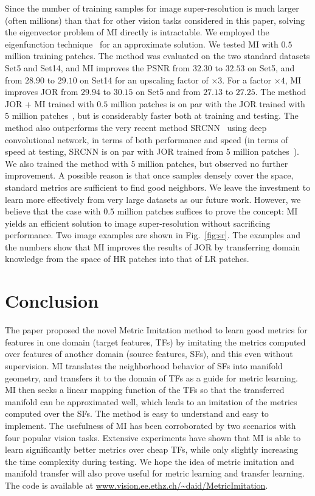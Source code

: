 Since the number of training samples for image super-resolution is
much larger (often millions) than that for other vision tasks considered 
in this paper, solving the eigenvector problem of MI directly is 
intractable. We employed the eigenfunction technique~\citep{Fergus09} 
for an approximate solution.  We
tested MI with $0.5$ million training patches.  The method was
evaluated on the two standard datasets Set5 and Set14, and MI improves
the PSNR from $32.30$ to $32.53$ on Set5, and from $28.90$ to $29.10$
on Set14 for an upscaling factor of $\times 3$. For a factor $\times 4$,
MI improves JOR from $29.94$ to $30.15$ on Set5 and from $27.13$ to
$27.25$. The method JOR + MI trained with $0.5$ million patches is on
par with the JOR trained with $5$ million patches~\citep{JOR:EG15}, but
is considerably faster both at training and testing.  The method also
outperforms the very recent method SRCNN~\citep{Dong-ECCV-2014} using
deep convolutional network, in terms of both performance and speed (in
terms of speed at testing, SRCNN is on par with JOR trained from 5
million patches~\citep{JOR:EG15}). We also trained the
method with $5$ million patches, but observed no further improvement. 
A possible reason is that once samples densely cover
the space, standard metrics are sufficient to find good
neighbors. We leave the investment to learn more effectively from very large datasets as our future work. 
However, we believe that the case with $0.5$ million
patches suffices to prove the concept: MI yields an
efficient solution to image super-resolution without sacrificing 
performance. 
Two image examples are shown in Fig.~\ref{fig:sr}. The examples and
the numbers show that MI improves the results of JOR by
transferring domain knowledge from the space of HR patches into that
of LR patches. 

\section{Conclusion}
\label{sec:con}
The paper proposed the novel Metric Imitation method to
learn good metrics for features in one domain (target
features, TFs) by imitating the metrics computed over features of
another domain (source features, SFs), and this even without supervision. 
MI translates the neighborhood
behavior of SFs into manifold geometry, and transfers it to the domain
of TFs as a guide for metric learning. MI then seeks a linear mapping
function of the TFs so that the transferred manifold can be
approximated well, which leads to an imitation of the metrics computed
over the SFs. The method is easy to understand and easy to implement. The usefulness
of MI has been corroborated by two scenarios with four popular vision
tasks. Extensive experiments have shown that MI is able to learn 
significantly better metrics over cheap TFs, while only slightly
increasing the time complexity during testing. We hope the idea of metric
imitation and manifold transfer will also prove useful for metric
learning and transfer learning. The code is available at
  \url{www.vision.ee.ethz.ch/~daid/MetricImitation}.

